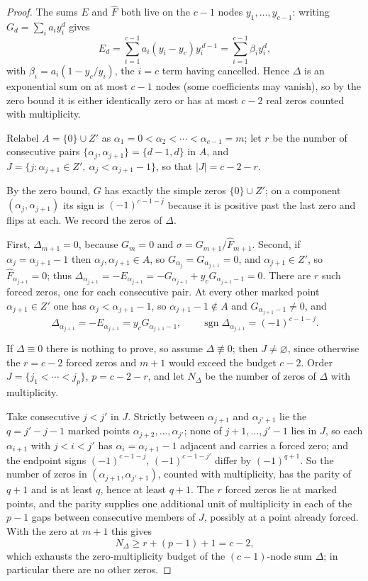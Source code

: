 \documentclass[11pt]{article}
\DeclareMathOperator{\sgn}{sgn}
\begin{document}
\begin{proof}
The sums $E$ and $\widehat F$ both live on the $c-1$ nodes
$y_1,\ldots,y_{c-1}$: writing $G_d=\sum_ia_iy_i^d$ gives
\[
  E_d=\sum_{i=1}^{c-1}a_i(y_i-y_c)y_i^{\,d-1}
      =\sum_{i=1}^{c-1}\beta_iy_i^d,
\]
with $\beta_i=a_i(1-y_c/y_i)$, the $i=c$ term having cancelled.  Hence $\Delta$
is an exponential sum on at most $c-1$ nodes (some coefficients may vanish),
so by the zero bound it is either identically zero or has at most $c-2$ real
zeros counted with multiplicity.

Relabel $A=\{0\}\cup Z'$ as $\alpha_1=0<\alpha_2<\cdots<\alpha_{c-1}=m$; let $r$ be the
number of consecutive pairs $\{\alpha_j,\alpha_{j+1}\}=\{d-1,d\}$ in $A$, and
$J=\{j:\alpha_{j+1}\in Z',\ \alpha_j<\alpha_{j+1}-1\}$, so that $|J|=c-2-r$.

By the zero bound, $G$ has exactly the simple zeros $\{0\}\cup Z'$; on a
component $(\alpha_j,\alpha_{j+1})$ its sign is $(-1)^{c-1-j}$ because it is positive
past the last zero and flips at each.  We record the zeros of $\Delta$.

First, $\Delta_{m+1}=0$, because $G_m=0$ and $\sigma=G_{m+1}/\widehat
F_{m+1}$.  Second, if $\alpha_j=\alpha_{j+1}-1$ then $\alpha_j,\alpha_{j+1}\in A$, so
$G_{\alpha_j}=G_{\alpha_{j+1}}=0$, and $\alpha_{j+1}\in Z'$, so $\widehat F_{\alpha_{j+1}}=0$;
thus $\Delta_{\alpha_{j+1}}=-E_{\alpha_{j+1}}=-G_{\alpha_{j+1}}+y_cG_{\alpha_{j+1}-1}=0$.  There
are $r$ such forced zeros, one for each consecutive pair.  At every other
marked point $\alpha_{j+1}\in Z'$ one has $\alpha_j<\alpha_{j+1}-1$, so
$\alpha_{j+1}-1\notin A$ and $G_{\alpha_{j+1}-1}\ne0$, and
\[
  \Delta_{\alpha_{j+1}}=-E_{\alpha_{j+1}}=y_cG_{\alpha_{j+1}-1},
  \qquad \sgn\Delta_{\alpha_{j+1}}=(-1)^{c-1-j}.
\]

If $\Delta\equiv0$ there is nothing to prove, so assume $\Delta\not\equiv0$;
then $J\ne\varnothing$, since otherwise the $r=c-2$ forced zeros and $m+1$
would exceed the budget $c-2$.  Order $J=\{j_1<\cdots<j_p\}$, $p=c-2-r$, and
let $N_\Delta$ be the number of zeros of $\Delta$ with multiplicity.

Take consecutive $j<j'$ in $J$.  Strictly between
$\alpha_{j+1}$ and $\alpha_{j'+1}$ lie the $q=j'-j-1$ marked points
$\alpha_{j+2},\ldots,\alpha_{j'}$; none of $j+1,\ldots,j'-1$ lies in $J$, so
each $\alpha_{i+1}$ with $j<i<j'$ has $\alpha_i=\alpha_{i+1}-1$ adjacent and
carries a forced zero; and the endpoint signs
$(-1)^{c-1-j}$, $(-1)^{c-1-j'}$ differ by $(-1)^{q+1}$.  So the number of
zeros in $(\alpha_{j+1},\alpha_{j'+1})$, counted with multiplicity, has the
parity of $q+1$ and is at least $q$, hence at least $q+1$.  The $r$ forced zeros lie at marked points, and the
parity supplies one additional unit of multiplicity in each of the $p-1$ gaps
between consecutive members of $J$, possibly at a point already forced.  With
the zero at $m+1$ this gives
\[
  N_\Delta\ge r+(p-1)+1=c-2,
\]
which exhausts the zero-multiplicity budget of the $(c-1)$-node sum $\Delta$; in
particular there are no other zeros.


\end{proof}
\end{document}
